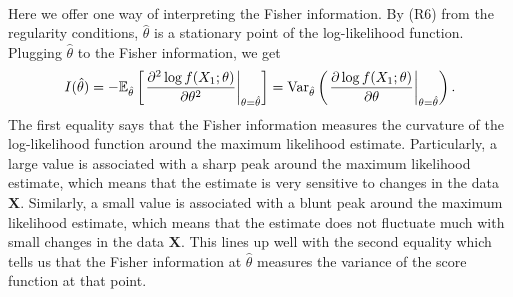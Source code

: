 $ $\\
Here we offer one way of interpreting the Fisher information. By (R6) from the regularity conditions, $\hat{\theta}$ is a stationary point of the log-likelihood function. Plugging $\hat{\theta}$ to the Fisher information, we get
\begin{align*}
I(\hat{\theta}) = -\mathbb{E}_{\hat{\theta}}\left[ \left.\frac{\partial^2\log f(X_1;\theta)}{\partial \theta^2}\right\vert_{\theta=\hat{\theta}} \right] = \text{Var}_{\hat{\theta}}\left( \left.\frac{\partial\log f(X_1;\theta)}{\partial \theta}\right\vert_{\theta=\hat{\theta}} \right).
\end{align*}
The first equality says that the Fisher information measures the curvature of the log-likelihood function around the maximum likelihood estimate. Particularly, a large value is associated with a sharp peak around the maximum likelihood estimate, which means that the estimate is very sensitive to changes in the data $\bm{X}$. Similarly, a small value is associated with a blunt peak around the maximum likelihood estimate, which means that the estimate does not fluctuate much with small changes in the data $\bm{X}$. This lines up well with the second equality which tells us that the Fisher information at $\hat{\theta}$ measures the variance of the score function at that point.
